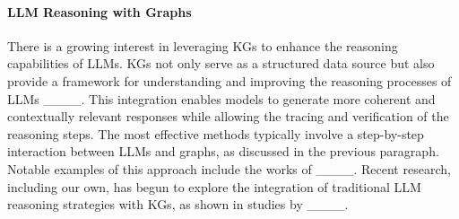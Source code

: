 
\vspace{-2pt} 
\paragraph{LLM Reasoning with Graphs} There is a growing interest in leveraging KGs to enhance the reasoning capabilities of LLMs. KGs not only serve as a structured data source but also provide a framework for understanding and improving the reasoning processes of LLMs ____. This integration enables models to generate more coherent and contextually relevant responses while allowing the tracing and verification of the reasoning steps. The most effective methods typically involve a step-by-step interaction between LLMs and graphs, as discussed in the previous paragraph. Notable examples of this approach include the works of ____. Recent research, including our own, has begun to explore the integration of traditional LLM reasoning strategies with KGs, as shown in studies by ____.

\vspace{-2pt}